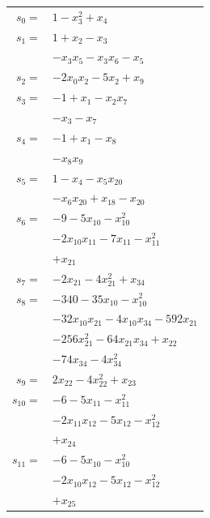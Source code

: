 \begingroup
\small
\setlength{\tabcolsep}{2pt}
\setlength{\LTleft}{0pt}
\begin{longtable}{@{}r@{\;}l@{}}
\(s_{0}=\) & \(\displaystyle 1 -x_{3}^{2} +x_{4}\) \\[3pt]
\(s_{1}=\) & \(\displaystyle 1 +x_{2} -x_{3}\) \\
 & \(\displaystyle -x_{3}x_{5} -x_{3}x_{6} -x_{5}\) \\[3pt]
\(s_{2}=\) & \(\displaystyle -2x_{0}x_{2} -5x_{2} +x_{9}\) \\[3pt]
\(s_{3}=\) & \(\displaystyle -1 +x_{1} -x_{2}x_{7}\) \\
 & \(\displaystyle -x_{3} -x_{7}\) \\[3pt]
\(s_{4}=\) & \(\displaystyle -1 +x_{1} -x_{8}\) \\
 & \(\displaystyle -x_{8}x_{9}\) \\[3pt]
\(s_{5}=\) & \(\displaystyle 1 -x_{4} -x_{5}x_{20}\) \\
 & \(\displaystyle -x_{6}x_{20} +x_{18} -x_{20}\) \\[3pt]
\(s_{6}=\) & \(\displaystyle -9 -5x_{10} -x_{10}^{2}\) \\
 & \(\displaystyle -2x_{10}x_{11} -7x_{11} -x_{11}^{2}\) \\
 & \(\displaystyle +x_{21}\) \\[3pt]
\(s_{7}=\) & \(\displaystyle -2x_{21} -4x_{21}^{2} +x_{34}\) \\[3pt]
\(s_{8}=\) & \(\displaystyle -340 -35x_{10} -x_{10}^{2}\) \\
 & \(\displaystyle -32x_{10}x_{21} -4x_{10}x_{34} -592x_{21}\) \\
 & \(\displaystyle -256x_{21}^{2} -64x_{21}x_{34} +x_{22}\) \\
 & \(\displaystyle -74x_{34} -4x_{34}^{2}\) \\[3pt]
\(s_{9}=\) & \(\displaystyle 2x_{22} -4x_{22}^{2} +x_{23}\) \\[3pt]
\(s_{10}=\) & \(\displaystyle -6 -5x_{11} -x_{11}^{2}\) \\
 & \(\displaystyle -2x_{11}x_{12} -5x_{12} -x_{12}^{2}\) \\
 & \(\displaystyle +x_{24}\) \\[3pt]
\(s_{11}=\) & \(\displaystyle -6 -5x_{10} -x_{10}^{2}\) \\
 & \(\displaystyle -2x_{10}x_{12} -5x_{12} -x_{12}^{2}\) \\
 & \(\displaystyle +x_{25}\) \\[3pt]

\end{longtable}
